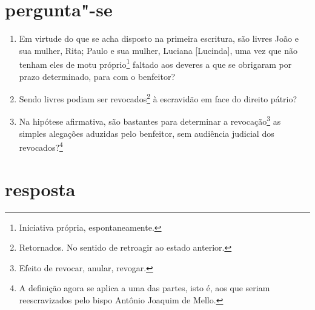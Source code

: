 \section*{pergunta"-se}

\begin{enumerate}[label=\arabic*º]
\item Em virtude do que se acha disposto na primeira escritura, são livres
João e sua mulher, Rita; Paulo e sua mulher, Luciana {[}Lucinda{]}, uma
vez que não tenham eles de motu próprio\footnote{Iniciativa própria,
  espontaneamente.} faltado aos deveres a que se obrigaram por prazo
determinado, para com o benfeitor?

\item Sendo livres podiam ser revocados\footnote{Retornados. No sentido
  de retroagir ao estado anterior.} à escravidão em face do direito
pátrio?

\item Na hipótese afirmativa, são bastantes para determinar a
revocação\footnote{Efeito de revocar, anular, revogar.} as simples
alegações aduzidas pelo benfeitor, sem audiência judicial dos
revocados?\footnote{A definição agora se aplica a uma das partes, isto
  é, aos que seriam reescravizados pelo bispo Antônio Joaquim de Mello.}
\end{enumerate}

\section*{resposta}

